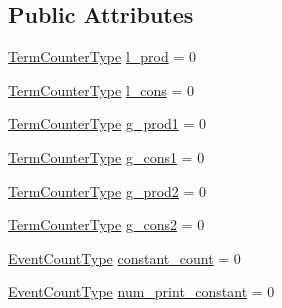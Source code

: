\subsection*{Public Attributes}
\begin{DoxyCompactItemize}
\item 
\hyperlink{namespacevt_1_1term_a4fd378cdb0c36683afc1b3399d685f7f}{Term\+Counter\+Type} \hyperlink{structvt_1_1term_1_1_term_state_afec657b7e75164bdc75f464dd4dbe13b}{l\+\_\+prod} = 0
\item 
\hyperlink{namespacevt_1_1term_a4fd378cdb0c36683afc1b3399d685f7f}{Term\+Counter\+Type} \hyperlink{structvt_1_1term_1_1_term_state_a4f44e5ddcb585df5ad215f10bc195d4c}{l\+\_\+cons} = 0
\item 
\hyperlink{namespacevt_1_1term_a4fd378cdb0c36683afc1b3399d685f7f}{Term\+Counter\+Type} \hyperlink{structvt_1_1term_1_1_term_state_a75ab01f0dcceb86687a3e26edada0620}{g\+\_\+prod1} = 0
\item 
\hyperlink{namespacevt_1_1term_a4fd378cdb0c36683afc1b3399d685f7f}{Term\+Counter\+Type} \hyperlink{structvt_1_1term_1_1_term_state_a91952f12d457df3a7e5f634957e9cbd7}{g\+\_\+cons1} = 0
\item 
\hyperlink{namespacevt_1_1term_a4fd378cdb0c36683afc1b3399d685f7f}{Term\+Counter\+Type} \hyperlink{structvt_1_1term_1_1_term_state_a5e7029af1dca0645c92f5a00316dc039}{g\+\_\+prod2} = 0
\item 
\hyperlink{namespacevt_1_1term_a4fd378cdb0c36683afc1b3399d685f7f}{Term\+Counter\+Type} \hyperlink{structvt_1_1term_1_1_term_state_aaaf3c5cec9c925c420082bb284a5a78e}{g\+\_\+cons2} = 0
\item 
\hyperlink{structvt_1_1term_1_1_term_state_a900fe4e9d98c81a320ae1dca27b71c2c}{Event\+Count\+Type} \hyperlink{structvt_1_1term_1_1_term_state_ae200479dfa6c38aa5d09ac6824fe2f49}{constant\+\_\+count} = 0
\item 
\hyperlink{structvt_1_1term_1_1_term_state_a900fe4e9d98c81a320ae1dca27b71c2c}{Event\+Count\+Type} \hyperlink{structvt_1_1term_1_1_term_state_ac3289ddbfa5c385c4d91d240bc17d67f}{num\+\_\+print\+\_\+constant} = 0
\end{DoxyCompactItemize}
